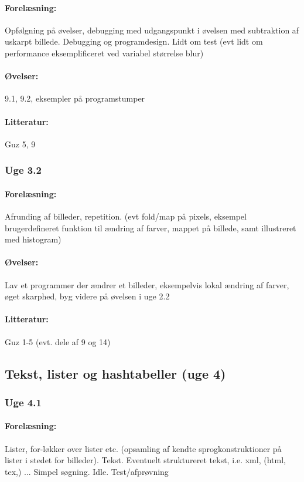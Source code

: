 \documentclass[12pt]{article}
\begin{document}
\paragraph{Forelæsning:} 
Opfølgning på øvelser, debugging med udgangspunkt i øvelsen med subtraktion af uskarpt billede.
Debugging og programdesign. Lidt om test
(evt lidt om performance eksemplificeret ved variabel størrelse blur)


\paragraph{Øvelser:}
9.1, 9.2, eksempler på programstumper
\paragraph{Litteratur:} Guz 5, 9


\subsubsection{Uge 3.2}
\paragraph{Forelæsning:} 
Afrunding af billeder, repetition.
(evt fold/map på pixels, eksempel brugerdefineret funktion til ændring af farver, mappet på billede, samt illustreret med histogram)

\paragraph{Øvelser:}
Lav et programmer der ændrer et billeder,
eksempelvis lokal ændring af farver, øget skarphed,
byg videre på øvelsen i uge 2.2
\paragraph{Litteratur:} Guz 1-5 (evt. dele af 9 og 14)

\subsection{Tekst, lister og hashtabeller (uge 4)}
\subsubsection{Uge 4.1}
\paragraph{Forelæsning:} 
Lister, for-løkker over lister etc. (opsamling af kendte sprogkonstruktioner på lister i stedet for billeder).
Tekst. Eventuelt struktureret tekst, i.e. xml, (html, tex,) ... Simpel søgning.
Idle. Test/afprøvning
\end{document}
